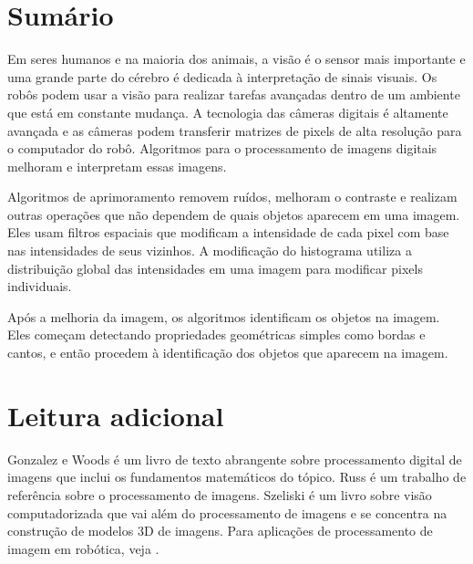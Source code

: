 \section{Sumário}

Em seres humanos e na maioria dos animais, a visão é o sensor mais importante e uma grande parte do cérebro é dedicada à interpretação de sinais visuais. Os robôs podem usar a visão para realizar tarefas avançadas dentro de um ambiente que está em constante mudança. A tecnologia das câmeras digitais é altamente avançada e as câmeras podem transferir matrizes de pixels de alta resolução para o computador do robô. Algoritmos para o processamento de imagens digitais melhoram e interpretam essas imagens.

Algoritmos de aprimoramento removem ruídos, melhoram o contraste e realizam outras operações que não dependem de quais objetos aparecem em uma imagem. Eles usam filtros espaciais que modificam a intensidade de cada pixel com base nas intensidades de seus vizinhos. A modificação do histograma utiliza a distribuição global das intensidades em uma imagem para modificar pixels individuais.

Após a melhoria da imagem, os algoritmos identificam os objetos na imagem. Eles começam detectando propriedades geométricas simples como bordas e cantos, e então procedem à identificação dos objetos que aparecem na imagem.

\section{Leitura adicional}

Gonzalez e Woods \cite{GW} é um livro de texto abrangente sobre processamento digital de imagens que inclui os fundamentos matemáticos do tópico. Russ \cite{russ} é um trabalho de referência sobre o processamento de imagens. Szeliski \cite{szeliski} é um livro sobre visão computadorizada que vai além do processamento de imagens e se concentra na construção de modelos 3D de imagens. Para aplicações de processamento de imagem em robótica, veja \cite[Chapter~4]{siegwart}.
